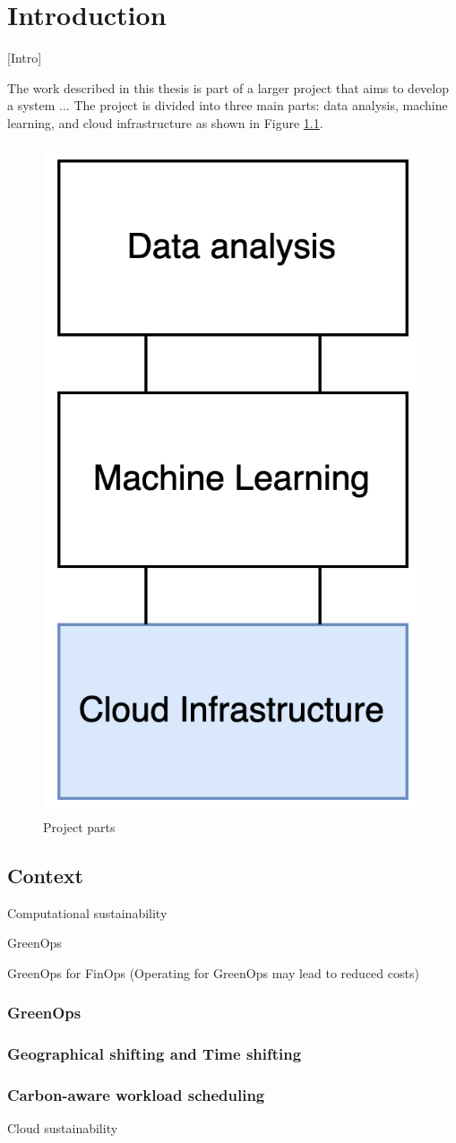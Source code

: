 \chapter{Introduction}
\label{cha:introduction}

[Intro]

The work described in this thesis is part of a larger project that aims to develop a system ... 
The project is divided into three main parts: data analysis, machine learning, and cloud infrastructure as shown in Figure \ref{fig:project_parts}.

\begin{figure}[htb]
    \centering
    \includegraphics[width=0.25\linewidth]{images/project_parts.png}
    \caption{Project parts}
    \label{fig:project_parts}
\end{figure}

\section{Context}
\label{sec:context}

Computational sustainability

GreenOps

GreenOps for FinOps
(Operating for GreenOps may lead to reduced costs)

\subsection{GreenOps}
\subsection{Geographical shifting and Time shifting}
\subsection{Carbon-aware workload scheduling}


Cloud sustainability

